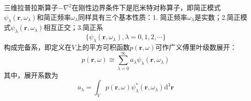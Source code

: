 三维拉普拉斯算子$-\nabla^{2}$在刚性边界条件下是厄米特对称算子，即简正模式$\psi_{\lambda}(\mathbf{r},\omega_{\lambda})$和简正频率$\omega_{\lambda}$同样具有三个基本性质：1. 简正频率$\omega_{\lambda}$是实数；2.简正模式$\psi_{\lambda}(\mathbf{r},\omega_{\lambda})$相互正交；3.简正系
\begin{equation}\label{eq2-29}
  \{\psi_{\lambda}(\mathbf{r},\omega_{\lambda}),\lambda = 0,1,2,\cdots\}
\end{equation}
构成完备系，即定义在$V$上的平方可积函数$p(\mathbf{r},\omega)$可作广义傅里叶级数展开：
\begin{equation}\label{eq2-30}
  p(\mathbf{r},\omega)\cong\sum_{\lambda = 0}^{\infty}a_{\lambda}\psi_{\lambda}(\mathbf{r},\omega_{\lambda})
\end{equation}
其中，展开系数为
\begin{equation}\label{eq2-31}
  a_{\lambda}=\int_{V}p(\mathbf{r},\omega)\psi_{\lambda}^{*}(\mathbf{r},\omega_{\lambda})\mathrm{d}^{3}\mathbf{r}
\end{equation}

